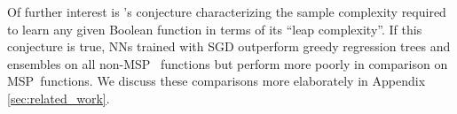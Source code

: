 \documentclass[11pt]{article}
\newcommand{\nfeats}{d}
\newcommand{\MSP}{\textsf{MSP}}
\begin{document}
Of further interest is \cite{abbe2023sgd}'s conjecture characterizing the sample complexity required to learn any given Boolean function in terms of its ``leap complexity''.
If this conjecture is true, NNs trained with SGD outperform greedy regression trees and ensembles on all non-\MSP~ functions but perform more poorly in comparison on \MSP~functions.
We discuss these comparisons more elaborately in Appendix \ref{sec:related_work}.


\end{document}
